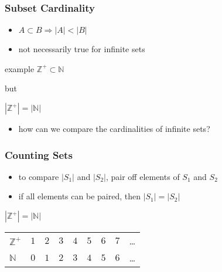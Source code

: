 \documentclass[dvipsnames]{beamer}
\begin{document}
\begin{frame}
  \frametitle{Subset Cardinality}

  \begin{itemize}
    \item $A \subset B \Rightarrow |A| < |B|$

    \pause
    \item not necessarily true for infinite sets
  \end{itemize}

  \begin{exampleblock}{example}
$\mathbb{Z}^+ \subset \mathbb{N}$

\smallskip
but

\smallskip
$|\mathbb{Z}^+| = |\mathbb{N}|$
  \end{exampleblock}

  \pause
  \begin{itemize}
    \item how can we compare the cardinalities of infinite sets?
  \end{itemize}
\end{frame}

\begin{frame}
  \frametitle{Counting Sets}

  \begin{itemize}
    \item to compare $|S_1|$ and $|S_2|$, pair off elements of $S_1$ and $S_2$
    \item if all elements can be paired, then $|S_1| = |S_2|$
  \end{itemize}

  \pause
  \begin{exampleblock}{$|\mathbb{Z}^+| = |\mathbb{N}|$}
    \begin{tabular}{lcccccccc}
      $\mathbb{Z}^+$ & $1$ & $2$ & $3$ & $4$ & $5$ & $6$ & $7$ & \ldots\\
      $\mathbb{N}$   & $0$ & $1$ & $2$ & $3$ & $4$ & $5$ & $6$ & \ldots\\
    \end{tabular}
  \end{exampleblock}
\end{frame}
\end{document}
